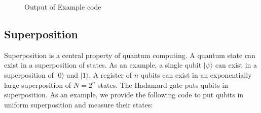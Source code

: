 \documentclass{article}
\begin{document}
\begin{figure}[h]



\caption{Output of Example code}


\end{figure}




\subsection{Superposition}

Superposition is a central property of quantum computing. A quantum state can exist in a superposition of states. As an example, a single qubit $\lvert \psi \rangle$ can exist in a superposition of $\lvert 0 \rangle$ and $\lvert 1 \rangle$. A register of $n$ qubits can exist in an exponentially large superposition of $N=2^n$ states. The Hadamard gate puts qubits in superposition. As an example, we provide the following code to put qubits in uniform superposition and measure their states:
\end{document}
